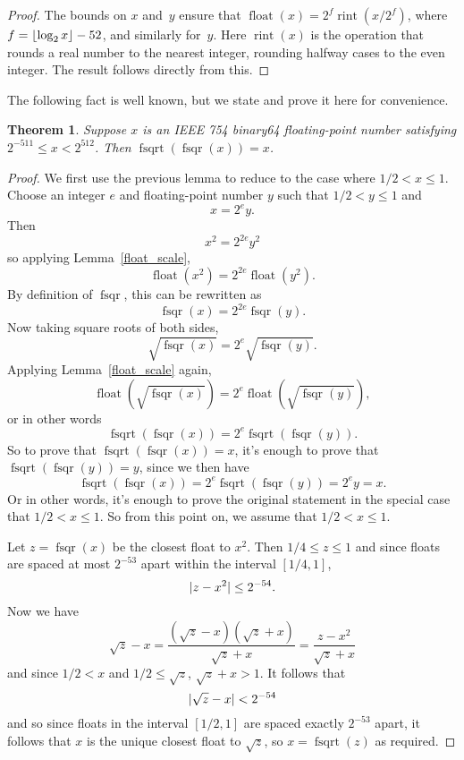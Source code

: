 \documentclass[a4paper]{article}
\DeclarePairedDelimiter\floor{\lfloor}{\rfloor}
\DeclarePairedDelimiter\abs{\lvert}{\rvert}
\DeclareMathOperator{\fsqrt}{fsqrt}
\DeclareMathOperator{\fsqr}{fsqr}
\DeclareMathOperator{\float}{float}
\DeclareMathOperator{\rint}{rint}
\theoremstyle{plain}
\newtheorem{theorem}{Theorem}
\theoremstyle{definition}
\begin{document}
\begin{proof}
  The bounds on $x$ and~$y$ ensure that $\float(x) = 2^f \rint(x / 2^f)$, where
  $f = \floor{\log_2 x} - 52$, and similarly for~$y$. Here $\rint(x)$ is the
  operation that rounds a real number to the nearest integer, rounding halfway
  cases to the even integer. The result follows directly from this.
\end{proof}

The following fact is well known, but we state and prove it here for
convenience.

\begin{theorem}\label{sqrt_of_sqr}
  Suppose $x$ is an IEEE 754 binary64 floating-point number satisfying
  $2^{-511} \le x < 2^{512}$. Then $\fsqrt(\fsqr(x)) = x$.
\end{theorem}

\begin{proof}
  We first use the previous lemma to reduce to the case where $1/2 < x \le 1$.
  Choose an integer $e$ and floating-point number $y$ such that $1/2 < y \le 1$
  and
  $$x = 2^e y.$$
  Then
  $$x^2 = 2^{2e}y^2$$
  so applying Lemma~\ref{float_scale},
  $$\float(x^2) = 2^{2e}\float(y^2).$$
  By definition of $\fsqr$, this can be rewritten as
  $$\fsqr(x) = 2^{2e}\fsqr(y).$$
  Now taking square roots of both sides,
  $$\sqrt{\fsqr(x)} = 2^e \sqrt{\fsqr(y)}.$$
  Applying Lemma~\ref{float_scale} again,
  $$\float(\sqrt{\fsqr(x)}) = 2^e \float(\sqrt{\fsqr(y)}),$$
  or in other words
  $$\fsqrt(\fsqr(x)) = 2^e \fsqrt(\fsqr(y)).$$
  So to prove that $\fsqrt(\fsqr(x)) = x$, it's enough to prove that
  $\fsqrt(\fsqr(y)) = y$, since we then have
  $$\fsqrt(\fsqr(x)) = 2^e \fsqrt(\fsqr(y)) = 2^e y = x.$$
  Or in other words, it's enough to prove the original statement in the special
  case that $1/2 < x \le 1$. So from this point on, we assume that $1/2 < x \le
  1$.

  Let $z = \fsqr(x)$ be the closest float to $x^2$. Then $1/4 \le z \le 1$ and
  since floats are spaced at most $2^{-53}$ apart within the interval $[1/4,
  1]$,
  $$\abs{z - x^2} \le 2^{-54}.$$ Now we have
  $$\sqrt z - x = \frac{(\sqrt z - x)(\sqrt z + x)}{\sqrt z + x} = \frac{z -
  x^2}{\sqrt z + x}$$ and since $1/2 < x$ and $1/2 \le \sqrt z $, $\sqrt z + x
  > 1$. It follows that
  $$\abs{\sqrt z - x} < 2^{-54}$$ and so since floats in the interval $[1/2,
  1]$ are spaced exactly $2^{-53}$ apart, it follows that $x$ is the unique
  closest float to $\sqrt z$, so $x = \fsqrt(z)$ as required.
\end{proof}
\end{document}

